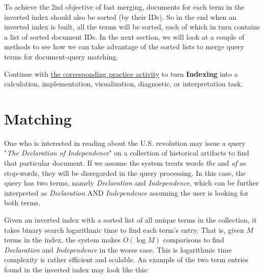 \documentclass[
  letterpaper,
]{scrbook}
\begin{document}
To achieve the 2nd objective of fast merging, documents for each term in
the inverted index should also be sorted (by their IDs). So in the end
when an inverted index is built, all the terms will be sorted, each of
which in turn contains a list of sorted document IDs. In the next
section, we will look at a couple of methods to see how we can take
advantage of the sorted lists to merge query terms for document-query
matching.

\begin{tcolorbox}[enhanced jigsaw, arc=.35mm, bottomrule=.15mm, bottomtitle=1mm, breakable, colback=white, colbacktitle=quarto-callout-tip-color!10!white, colframe=quarto-callout-tip-color-frame, coltitle=black, left=2mm, leftrule=.75mm, opacityback=0, opacitybacktitle=0.6, rightrule=.15mm, title=\textcolor{quarto-callout-tip-color}{\faLightbulb}\hspace{0.5em}{Put it into practice}, titlerule=0mm, toprule=.15mm, toptitle=1mm]

Continue with \hyperref[sec-pr-12-indexing]{the corresponding practice
activity} to turn \textbf{Indexing} into a calculation, implementation,
visualization, diagnostic, or interpretation task.

\end{tcolorbox}

\section{Matching}\label{ch-ir-match}

One who is interested in reading about the U.S. revolution may issue a
query "\emph{The Declaration of Independence}" on a collection of
historical artifacts to find that particular document. If we assume the
system treats words \emph{the} and \emph{of} as stop-words, they will be
disregarded in the query processing. In this case, the query has two
terms, namely \emph{Declaration} and \emph{Independence}, which can be
further interpreted as \emph{Declaration} AND \emph{Independence}
assuming the user is looking for both terms.

Given an inverted index with a sorted list of all unique terms in the
collection, it takes binary search logarithmic time to find each term's
entry. That is, given \(M\) terms in the index, the system makes
\(O(\log{M})\) comparisons to find \emph{Declaration} and
\emph{Independence} in the worse case. This is logarithmic time
complexity is rather efficient and scalable. An example of the two term
entries found in the inverted index may look like this:
\end{document}

